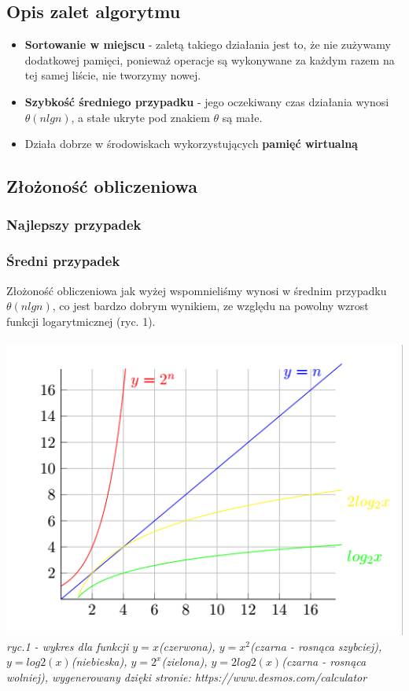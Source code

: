 \documentclass[12pt]{article}
\begin{document}
\subsection{Opis zalet algorytmu}
\begin{itemize}
\item \textbf{Sortowanie w miejscu} - zaletą takiego działania jest to, że nie zużywamy dodatkowej pamięci, ponieważ operacje są wykonywane za każdym razem na tej samej liście, nie tworzymy nowej.
\item \textbf{Szybkość średniego przypadku} - jego oczekiwany czas działania wynosi $\theta(nlgn)$, a stałe ukryte pod znakiem $\theta$ są małe.
\item Działa dobrze w środowiskach wykorzystujących \textbf{pamięć wirtualną}
\end{itemize}
\subsection{Złożoność obliczeniowa}
\subsubsection{Najlepszy przypadek}

\subsubsection{Średni przypadek}
Złożoność obliczeniowa jak wyżej wspomnieliśmy wynosi w średnim przypadku $\theta(nlgn)$, co jest bardzo dobrym wynikiem, ze względu na powolny wzrost funkcji logarytmicznej (ryc. 1). \\
\\
\includegraphics[scale=0.5]{funkcje.PNG}
\textit{ryc.1 - wykres dla funkcji $y=x$(czerwona), $y=x^2$(czarna - rosnąca szybciej), $y=log2(x)$(niebieska), $y=2^x$(zielona), $y=2log2(x)$(czarna - rosnąca wolniej), wygenerowany dzięki stronie: https://www.desmos.com/calculator}
\end{document}
